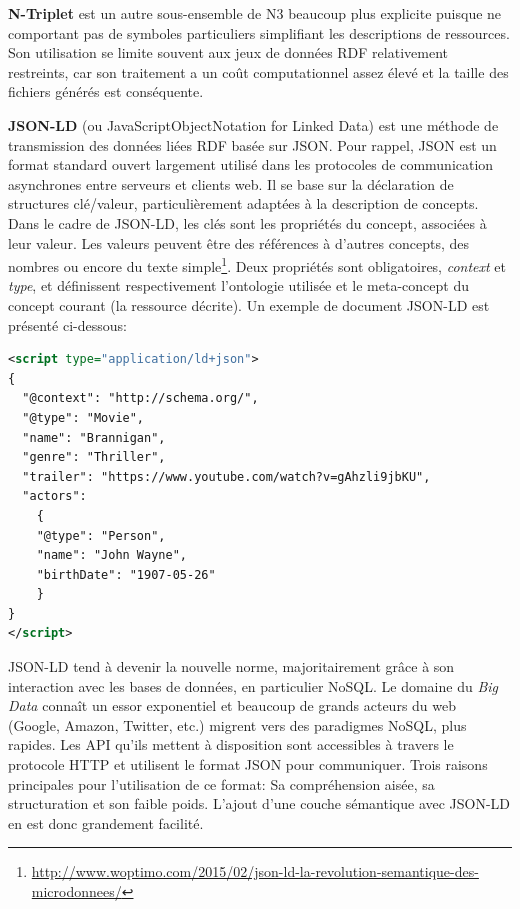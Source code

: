 \textbf{N-Triplet} est un autre sous-ensemble de N3 beaucoup plus explicite puisque ne comportant pas de symboles particuliers simplifiant les descriptions de ressources. Son utilisation se limite souvent aux jeux de données RDF relativement restreints, car son traitement a un coût computationnel assez élevé et la taille des fichiers générés est conséquente.

\textbf{JSON-LD} (ou JavaScriptObjectNotation for Linked Data) est une méthode de transmission des données liées RDF basée sur JSON. Pour rappel, JSON est un format standard ouvert largement utilisé dans les protocoles de communication asynchrones entre serveurs et clients web. Il se base sur la déclaration de structures clé/valeur, particulièrement adaptées à la description de concepts. 
Dans le cadre de JSON-LD, les clés sont les propriétés du concept, associées à leur valeur. Les valeurs peuvent être des références à d’autres concepts, des nombres ou encore du texte simple\footnote{\url{http://www.woptimo.com/2015/02/json-ld-la-revolution-semantique-des-microdonnees/}}. Deux propriétés sont obligatoires, \textit{context} et \textit{type}, et définissent respectivement l'ontologie utilisée et le meta-concept du concept courant (la ressource décrite). Un exemple de document JSON-LD est présenté ci-dessous:

\begin{lstlisting}[language=XML]
<script type="application/ld+json">
{
  "@context": "http://schema.org/",
  "@type": "Movie",
  "name": "Brannigan",
  "genre": "Thriller",
  "trailer": "https://www.youtube.com/watch?v=gAhzli9jbKU",
  "actors":
    {
    "@type": "Person",
    "name": "John Wayne",
    "birthDate": "1907-05-26"
    }
}
</script>
\end{lstlisting}

JSON-LD tend à devenir la nouvelle norme, majoritairement grâce à son interaction avec les bases de données, en particulier NoSQL. Le domaine du \textit{Big Data} connaît un essor exponentiel et beaucoup de grands acteurs du web (Google, Amazon, Twitter, etc.) migrent vers des paradigmes NoSQL, plus rapides. Les API qu'ils mettent à disposition sont accessibles à travers le protocole HTTP et utilisent le format JSON pour communiquer. Trois raisons principales pour l'utilisation de ce format: Sa compréhension aisée, sa structuration et son faible poids. L'ajout d'une couche sémantique avec JSON-LD en est donc grandement facilité. 

